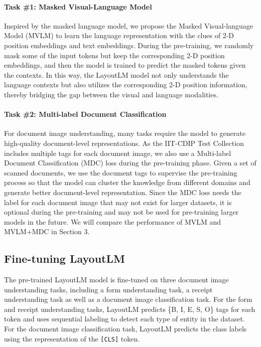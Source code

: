\documentclass[sigconf]{acmart}
\begin{document}
\paragraph{Task \#1: Masked Visual-Language Model}
Inspired by the masked language model, we propose the Masked Visual-language Model (MVLM) to learn the language representation with the clues of 2-D position embeddings and text embeddings. During the pre-training, we randomly mask some of the input tokens but keep the corresponding 2-D position embeddings, and then the model is trained to predict the masked tokens given the contexts. In this way, the LayoutLM model not only understands the language contexts but also utilizes the corresponding 2-D position information, thereby bridging the gap between the visual and language modalities.

\paragraph{Task \#2: Multi-label Document Classification}
For document image understanding, many tasks require the model to generate high-quality document-level representations. As the IIT-CDIP Test Collection includes multiple tags for each document image, we also use a Multi-label Document Classification (MDC) loss during the pre-training phase. Given a set of scanned documents, we use the document tags to supervise the pre-training process so that the model can cluster the knowledge from different domains and generate better document-level representation. Since the MDC loss needs the label for each document image that may not exist for larger datasets, it is optional during the pre-training and may not be used for pre-training larger models in the future. We will compare the performance of MVLM and MVLM+MDC in Section 3.

\subsection{Fine-tuning LayoutLM}
The pre-trained LayoutLM model is fine-tuned on three document image understanding tasks, including a form understanding task, a receipt understanding task as well as a document image classification task. For the form and receipt understanding tasks, LayoutLM predicts \{B, I, E, S, O\} tags for each token and uses sequential labeling to detect each type of entity in the dataset. For the document image classification task, LayoutLM predicts the class labels using the representation of the {\tt[CLS]} token.
\end{document}

